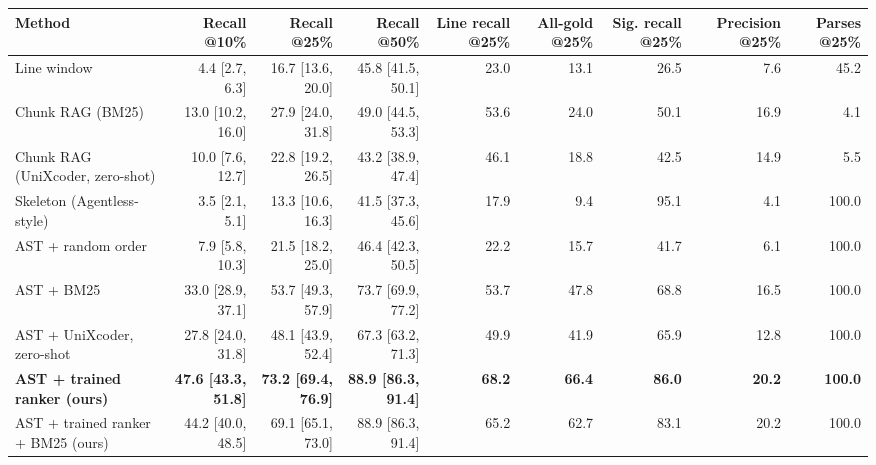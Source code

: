 \begin{tabular}{lrrrrrrrr}
\toprule
Method & Recall @10\% & Recall @25\% & Recall @50\% & Line recall @25\% & All-gold @25\% & Sig. recall @25\% & Precision @25\% & Parses @25\% \\
\midrule
Line window & 4.4 [2.7, 6.3] & 16.7 [13.6, 20.0] & 45.8 [41.5, 50.1] & 23.0 & 13.1 & 26.5 & 7.6 & 45.2 \\
Chunk RAG (BM25) & 13.0 [10.2, 16.0] & 27.9 [24.0, 31.8] & 49.0 [44.5, 53.3] & 53.6 & 24.0 & 50.1 & 16.9 & 4.1 \\
Chunk RAG (UniXcoder, zero-shot) & 10.0 [7.6, 12.7] & 22.8 [19.2, 26.5] & 43.2 [38.9, 47.4] & 46.1 & 18.8 & 42.5 & 14.9 & 5.5 \\
Skeleton (Agentless-style) & 3.5 [2.1, 5.1] & 13.3 [10.6, 16.3] & 41.5 [37.3, 45.6] & 17.9 & 9.4 & 95.1 & 4.1 & 100.0 \\
AST + random order & 7.9 [5.8, 10.3] & 21.5 [18.2, 25.0] & 46.4 [42.3, 50.5] & 22.2 & 15.7 & 41.7 & 6.1 & 100.0 \\
AST + BM25 & 33.0 [28.9, 37.1] & 53.7 [49.3, 57.9] & 73.7 [69.9, 77.2] & 53.7 & 47.8 & 68.8 & 16.5 & 100.0 \\
AST + UniXcoder, zero-shot & 27.8 [24.0, 31.8] & 48.1 [43.9, 52.4] & 67.3 [63.2, 71.3] & 49.9 & 41.9 & 65.9 & 12.8 & 100.0 \\
\textbf{AST + trained ranker (ours)} & \textbf{47.6 [43.3, 51.8]} & \textbf{73.2 [69.4, 76.9]} & \textbf{88.9 [86.3, 91.4]} & \textbf{68.2} & \textbf{66.4} & \textbf{86.0} & \textbf{20.2} & \textbf{100.0} \\
AST + trained ranker + BM25 (ours) & 44.2 [40.0, 48.5] & 69.1 [65.1, 73.0] & 88.9 [86.3, 91.4] & 65.2 & 62.7 & 83.1 & 20.2 & 100.0 \\
\bottomrule
\end{tabular}
